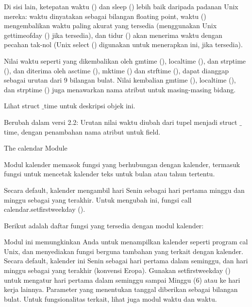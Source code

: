 \vspace{12pt}
\noindent 
Di sisi lain, ketepatan waktu () dan sleep () lebih baik daripada padanan Unix mereka: waktu dinyatakan sebagai bilangan floating point, waktu () mengembalikan waktu paling akurat yang tersedia (menggunakan Unix gettimeofday () jika tersedia), dan tidur () akan menerima waktu dengan pecahan tak-nol (Unix select () digunakan untuk menerapkan ini, jika tersedia). \par
\vspace{12pt}
\noindent 
Nilai waktu seperti yang dikembalikan oleh gmtime (), localtime (), dan strptime (), dan diterima oleh asctime (), mktime () dan strftime (), dapat dianggap sebagai urutan dari 9 bilangan bulat. Nilai kembalian gmtime (), localtime (), dan strptime () juga menawarkan nama atribut untuk masing-masing bidang. \par
\vspace{12pt}
\noindent 
Lihat struct $  \_  $time untuk deskripsi objek ini. \par
\vspace{12pt}
\noindent 
Berubah dalam versi 2.2: Urutan nilai waktu diubah dari tupel menjadi struct $  \_  $time, dengan penambahan nama atribut untuk field. \par
\vspace{12pt}
\vspace{12pt}
\noindent 
{\fontsize{16pt}{16pt}\selectfont The $  $calendar $  $Module \\} \par
\noindent 
Modul kalender memasok fungsi yang berhubungan dengan kalender, termasuk fungsi untuk mencetak kalender teks untuk bulan atau tahun tertentu. \par
\noindent 
Secara default, kalender mengambil hari Senin sebagai hari pertama minggu dan minggu sebagai yang terakhir. Untuk mengubah ini, fungsi call calendar.setfirstweekday (). \par
\noindent 
Berikut adalah daftar fungsi yang tersedia dengan modul kalender: \par
\noindent 
Modul ini memungkinkan Anda untuk menampilkan kalender seperti program cal Unix, dan menyediakan fungsi berguna tambahan yang terkait dengan kalender. Secara default, kalender ini Senin sebagai hari pertama dalam seminggu, dan hari minggu sebagai yang terakhir (konvensi Eropa). Gunakan setfirstweekday () untuk mengatur hari pertama dalam seminggu sampai Minggu (6) atau ke hari kerja lainnya. Parameter yang menentukan tanggal diberikan sebagai bilangan bulat. Untuk fungsionalitas terkait, lihat juga modul waktu dan waktu. \par
